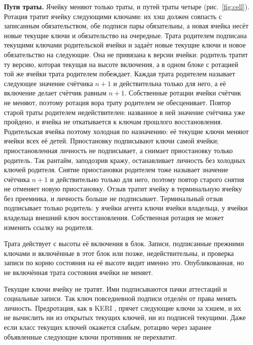\documentclass[10pt,a4paper]{article}
\begin{document}
\textbf{Пути траты.}
Ячейку меняют только траты, и путей траты четыре (рис.~\ref{fig:cell}).
Ротация тратит ячейку следующими ключами: их хэш должен совпасть с записанным обязательством, обе подписи пары обязательны, а новая ячейка несёт новые текущие ключи и обязательство на очередные.
Трата родителем подписана текущими ключами родительской ячейки и задаёт новые текущие ключи и новое обязательство на следующие.
Она не привязана к версии ячейки: родитель тратит ту версию, которая текущая на высоте включения, а в одном блоке с ротацией той же ячейки трата родителем побеждает.
Каждая трата родителем называет следующее значение счётчика $n{+}1$ и действительна только для него, а её включение делает счётчик равным $n{+}1$.
Собственные ротации ячейки счётчик не меняют, поэтому ротация вора трату родителем не обесценивает.
Повтор старой траты родителем недействителен: названное в ней значение счётчика уже пройдено, и ячейка не откатывается к ключам прошлого восстановления.
Родительская ячейка поэтому холодная по назначению: её текущие ключи меняют ячейки всех её детей.
Приостановку подписывают ключи самой ячейки; приостановленная личность не подписывает, а снимает приостановку только родитель.
Так рантайм, заподозрив кражу, останавливает личность без холодных ключей родителя.
Снятие приостановки родителем тоже называет значение счётчика $n{+}1$ и действительно только для него, поэтому повтор старого снятия не отменяет новую приостановку.
Отзыв тратит ячейку в терминальную ячейку без преемника, и личность больше не подписывает.
Терминальный отзыв подписывает только родитель: у ячейки агента ключи ячейки владельца, у ячейки владельца внешний ключ восстановления.
Собственная ротация не может изменить ссылку на родителя.

Трата действует с высоты её включения в блок.
Записи, подписанные прежними ключами и включённые в этот блок или позже, недействительны, и проверка записи по корню состояния на её высоте видит именно это.
Опубликованная, но не включённая трата состояния ячейки не меняет.

Текущие ключи ячейку не тратят.
Ими подписываются пачки аттестаций и социальные записи.
Так ключ повседневной подписи отделён от права менять личность.
Предротация, как в KERI \cite{keri}, прячет следующие ключи за хэшем, и их не вычислить ни из открытых текущих ключей, ни из подписей текущими.
Даже если класс текущих ключей окажется слабым, ротацию через заранее объявленные следующие ключи противник не перехватит.
\end{document}
